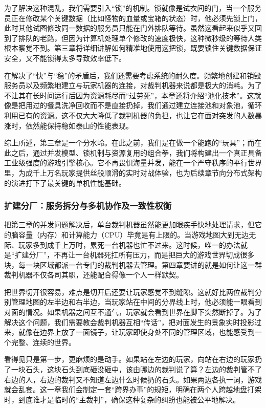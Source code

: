为了解决这种混乱，我们需要引入“锁”的机制。锁就像是试衣间的门，当一个服务员正在修改某个关键数据（比如怪物的血量或宝箱的状态）时，他必须先锁上门，此时其他试图修改同一数据的服务员只能在门外排队等待。虽然这看起来似乎又回到了排队的老路，但因为计算机处理单个修改的速度极快，这种微秒级的等待人类根本察觉不到。第三章将详细讲解如何精准地使用这把锁，既要锁住关键数据保证安全，又不能锁得太多导致效率低下。

在解决了“快”与“稳”的矛盾后，我们还需要考虑系统的耐久度。频繁地创建和销毁服务员以及频繁地建立与玩家机器的连接，对裁判机器来说都是极大的消耗。为了不让其在长时间运行后因为资源耗尽而“过劳死”，本章还将介绍“池化技术”。这就像是把用过的餐具洗净回收而不是直接扔掉，我们通过建立连接池和对象池，循环利用已有的资源。这不仅大大降低了裁判机器的负担，也让它在面对突发的人数暴涨时，依然能保持稳如泰山的性能表现。

综上所述，第三章是一个分水岭。在此之前，我们是在做一个能跑的“玩具”；而在此之后，通过并发模型、锁机制与资源复用的组合拳，我们将构建出一个真正具备工业级强度的游戏引擎核心。它不再畏惧海量并发，能在一个严守秩序的平行世界里，为成千上万名玩家提供丝般顺滑的实时对战体验，也为后续章节向分布式架构的演进打下了最关键的单机性能基础。



\subsubsection{扩建分厂：服务拆分与多机协作及一致性权衡}\label{sec:服务拆分与多机协作及一致性权衡}
把第三章的并发问题解决后，单台裁判机器虽然能更加眼疾手快地处理请求，但它的脑容量（内存）和计算能力（CPU）毕竟是有上限的。当游戏地图大到无边无际、玩家多到成千上万时，累死一台机器也忙不过来。这时候，唯一的办法就是“扩建分厂”，不再让一台机器死扛所有压力，而是把巨大的游戏世界切成很多块，每一块区域都派一台专门的裁判机器去管理。第四章要讲的就是如何让这一群裁判机器不仅各司其职，还能配合得像一个人一样默契。

把世界切开很容易，难点是切开后还要让玩家感觉不到缝隙。这就好比两位裁判分别管理地图的左半边和右半边，当玩家站在中间的分界线上时，他必须能一眼看到对面的情况。如果机器之间互不通气，玩家就会看到世界在脚下突然断掉了。为了解决这个问题，我们需要教会裁判机器互相“传话”，把对面发生的景象实时投影过来，就像在边界上放了一面镜子，让玩家即使身处不同的管理区域，也能感受到一个完整、连续的世界。

看得见只是第一步，更麻烦的是动手。如果站在左边的玩家，向站在右边的玩家扔了一块石头，这块石头到底砸没砸中，该由哪边的裁判说了算？左边的裁判管不了右边的人，右边的裁判又不知道左边什么时候扔的石头。如果两边各执一词，游戏就会乱套。这一章我们会制定一套“跨界办事”的规矩，明确在两个人跨越地盘打架时，到底谁才是临时的“主裁判”，确保这种复杂的纠纷也能被公平地解决。

